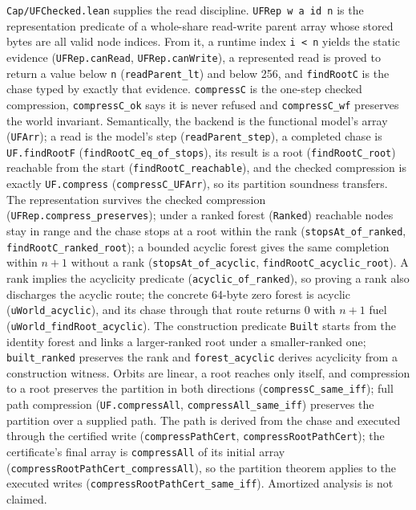 \documentclass[10pt,a4paper]{article}
\newcommand{\file}[1]{\texttt{\small #1}}
\begin{document}
\file{Cap/UFChecked.lean} supplies the read discipline. \texttt{UFRep w a id n}
is the representation predicate of a whole-share read-write parent array whose
stored bytes are all valid node indices. From it, a runtime index \texttt{i < n}
yields the static evidence (\texttt{UFRep.canRead}, \texttt{UFRep.canWrite}), a
represented read is proved to return a value below \texttt{n}
(\texttt{readParent\_lt}) and below 256, and \texttt{findRootC} is the chase
typed by exactly that evidence. \texttt{compressC} is the one-step checked
compression, \texttt{compressC\_ok} says it is never refused and
\texttt{compressC\_wf} preserves the world invariant. Semantically, the backend
is the functional model's array (\texttt{UFArr}); a read is the model's step
(\texttt{readParent\_step}), a completed chase is \texttt{UF.findRootF}
(\texttt{findRootC\_eq\_of\_stops}), its result is a root
(\texttt{findRootC\_root}) reachable from the start
(\texttt{findRootC\_reachable}), and the checked compression is exactly
\texttt{UF.compress} (\texttt{compressC\_UFArr}), so its partition soundness
transfers. The representation survives the checked compression
(\texttt{UFRep.compress\_preserves}); under a ranked forest
(\texttt{Ranked}) reachable nodes stay in range and the chase stops at a root
within the rank (\texttt{stopsAt\_of\_ranked},
\texttt{findRootC\_ranked\_root}); a bounded acyclic forest gives the same
completion within $n+1$ without a rank (\texttt{stopsAt\_of\_acyclic},
\texttt{findRootC\_acyclic\_root}). A rank implies the acyclicity predicate
(\texttt{acyclic\_of\_ranked}), so proving a rank also discharges the acyclic
route; the concrete 64-byte zero forest is acyclic
(\texttt{uWorld\_acyclic}), and its chase through that route returns 0 with
$n+1$ fuel (\texttt{uWorld\_findRoot\_acyclic}). The construction predicate
\texttt{Built} starts from the identity forest and links a larger-ranked root
under a smaller-ranked one; \texttt{built\_ranked} preserves the rank and
\texttt{forest\_acyclic} derives acyclicity from a construction witness. Orbits are linear, a root reaches only
itself, and compression to a root preserves the partition in both directions
(\texttt{compressC\_same\_iff}); full path compression
(\texttt{UF.compressAll}, \texttt{compressAll\_same\_iff}) preserves the
partition over a supplied path. The path is derived from the chase and
executed through the certified write (\texttt{compressPathCert},
\texttt{compressRootPathCert}); the certificate's final array is
\texttt{compressAll} of its initial array
(\texttt{compressRootPathCert\_compressAll}), so the partition theorem applies
to the executed writes (\texttt{compressRootPathCert\_same\_iff}). Amortized
analysis is not claimed.
\end{document}
